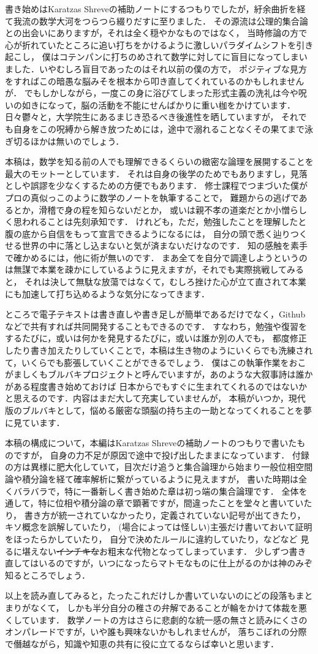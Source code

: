 
書き始めはKaratzas Shreveの補助ノートにするつもりでしたが，紆余曲折を経て我流の数学大河をつらつら綴りだすに至りました．
その源流は公理的集合論との出会いにありますが，それは全く穏やかなものではなく，
当時修論の方で心が折れていたところに追い打ちをかけるように激しいパラダイムシフトを引き起こし，
僕はコテンパンに打ちのめされて数学に対してに盲目になってしまいました．いやむしろ盲目であったのはそれ以前の僕の方で，
ポジティブな見方をすればこの暗愚な脳みそを根本から叩き直してくれているのかもしれませんが．
でもしかしながら，一度この身に浴びてしまった形式主義の洗礼は今や呪いの如きになって，脳の活動を不能にせんばかりに重い枷をかけています．
日々鬱々と，大学院生にあるまじき恐るべき後進性を晒していますが，
それでも自身をこの呪縛から解き放つためには，途中で溺れることなくその果てまで泳ぎ切るほかは無いのでしょう．

本稿は，数学を知る前の人でも理解できるくらいの緻密な論理を展開することを最大のモットーとしています．
それは自身の後学のためでもありますし，見落としや誤謬を少なくするための方便でもあります．
修士課程でつまづいた僕がプロの真似っこのように数学のノートを執筆することで，
難題からの逃げであるとか，滑稽で身の程を知らないだとか，
或いは親不孝の道楽だとか小憎らしく思われることは先刻承知です．
けれども，ただ，勉強したことを理解したと腹の底から自信をもって宣言できるようになるには，
自分の頭で悉く辿りつくせる世界の中に落とし込まないと気が済まないだけなのです．
知の感触を素手で確かめるには，他に術が無いのです．
まあ全てを自分で調達しようというのは無謀で本業を疎かにしているように見えますが，それでも実際挑戦してみると，
それは決して無駄な放蕩ではなくて，むしろ挫けた心が立て直されて本業にも加速して打ち込めるような気分になってきます．

ところで電子テキストは書き直しや書き足しが簡単であるだけでなく，Githubなどで共有すれば共同開発することもできるのです．
すなわち，勉強や復習をするたびに，或いは何かを発見するたびに，或いは誰か別の人でも，
都度修正したり書き加えたりしていくことで，本稿は生き物のようにいくらでも洗練されて，いくらでも膨張していくことができるでしょう．
僕はこの執筆作業をおこがましくもブルバキプロジェクトと呼んでいますが，あのような大叙事詩は誰かがある程度書き始めておけば
日本からでもすぐに生まれてくれるのではないかと思えるのです．内容はまだ大して充実していませんが，
本稿がいつか，現代版のブルバキとして，悩める厳密な頭脳の持ち主の一助となってくれることを夢に見ています．

本稿の構成について，本編はKaratzas Shreveの補助ノートのつもりで書いたものですが，
自身の力不足が原因で途中で投げ出したままになっています．
付録の方は異様に肥大化していて，目次だけ追うと集合論理から始まり一般位相空間論や積分論を経て確率解析に繋がっているように見えますが，
書いた時期は全くバラバラで，特に一番新しく書き始めた章は初っ端の集合論理です．
全体を通して，特に位相や積分論の章で顕著ですが，間違ったことを堂々と書いていたり，
書き方が統一されていなかったり，定義されていない記号が出てきたり，キソ概念を誤解していたり，
(場合によっては怪しい)主張だけ書いておいて証明をほったらかしていたり，
自分で決めたルールに違約していたり，などなど
見るに堪えない\sout{インチキな}お粗末な代物となってしまっています．
少しずつ書き直してはいるのですが，いつになったらマトモなものに仕上がるのかは神のみぞ知るところでしょう．

以上を読み直してみると，たったこれだけしか書いていないのにどの段落もまとまりがなくて，
しかも半分自分の稚さの弁解であることが輪をかけて体裁を悪くしています．
数学ノートの方はさらに悲劇的な統一感の無さと読みにくさのオンパレードですが，いや誰も興味ないかもしれませんが，
落ちこぼれの分際で僭越ながら，知識や知恵の共有に役に立てるならば幸いと思います．

